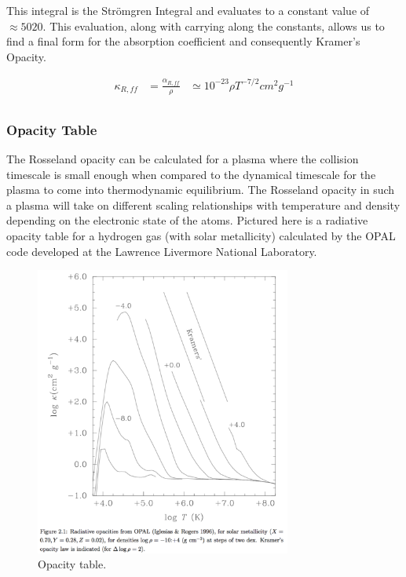 \documentclass{article}
\begin{document}
This integral is the Str{\"o}mgren Integral and evaluates to a constant value of $\approx 5020$. This evaluation, along with carrying along the constants, allows us to find a final form for the absorption coefficient and consequently Kramer's Opacity.

$$
\begin{aligned}
\kappa_{R,ff} &= \frac{\alpha_{R,ff}}{\rho} &\simeq 10^{-23} \rho T^{-7/2} cm^2 g^{-1} \\
\end{aligned}
$$

\subsubsection{Opacity Table}

The Rosseland opacity can be calculated for a plasma where the collision timescale is small enough when compared to the dynamical timescale for the plasma to come into thermodynamic equilibrium. The Rosseland opacity in such a plasma will take on different scaling relationships with temperature and density depending on the electronic state of the atoms. Pictured here is a radiative opacity table for a hydrogen gas (with solar metallicity) calculated by the OPAL code developed at the Lawrence Livermore National Laboratory.

\begin{figure}
    \centering
    \includegraphics[width=0.75\textwidth]{figures/500px-Opacity_table.png}
    \caption{Opacity table.}
    \label{fig:opTable}
\end{figure}
\end{document}
